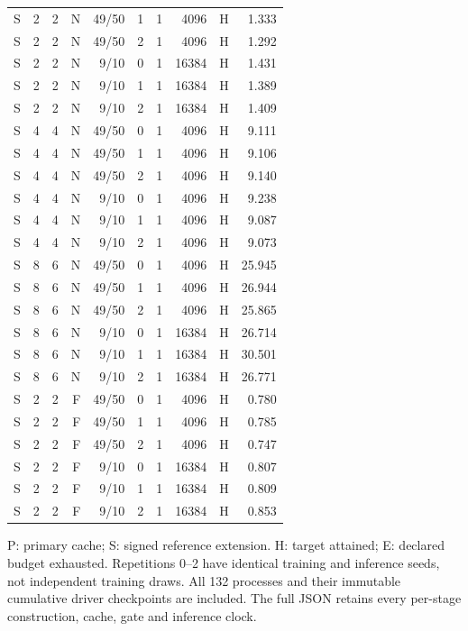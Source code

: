 \begin{longtable}{rrrrrrrrrr}
S & 2 & 2 & N & 49/50 & 1 & 1 & 4096 & H & 1.333 \\
S & 2 & 2 & N & 49/50 & 2 & 1 & 4096 & H & 1.292 \\
S & 2 & 2 & N & 9/10 & 0 & 1 & 16384 & H & 1.431 \\
S & 2 & 2 & N & 9/10 & 1 & 1 & 16384 & H & 1.389 \\
S & 2 & 2 & N & 9/10 & 2 & 1 & 16384 & H & 1.409 \\
S & 4 & 4 & N & 49/50 & 0 & 1 & 4096 & H & 9.111 \\
S & 4 & 4 & N & 49/50 & 1 & 1 & 4096 & H & 9.106 \\
S & 4 & 4 & N & 49/50 & 2 & 1 & 4096 & H & 9.140 \\
S & 4 & 4 & N & 9/10 & 0 & 1 & 4096 & H & 9.238 \\
S & 4 & 4 & N & 9/10 & 1 & 1 & 4096 & H & 9.087 \\
S & 4 & 4 & N & 9/10 & 2 & 1 & 4096 & H & 9.073 \\
S & 8 & 6 & N & 49/50 & 0 & 1 & 4096 & H & 25.945 \\
S & 8 & 6 & N & 49/50 & 1 & 1 & 4096 & H & 26.944 \\
S & 8 & 6 & N & 49/50 & 2 & 1 & 4096 & H & 25.865 \\
S & 8 & 6 & N & 9/10 & 0 & 1 & 16384 & H & 26.714 \\
S & 8 & 6 & N & 9/10 & 1 & 1 & 16384 & H & 30.501 \\
S & 8 & 6 & N & 9/10 & 2 & 1 & 16384 & H & 26.771 \\
S & 2 & 2 & F & 49/50 & 0 & 1 & 4096 & H & 0.780 \\
S & 2 & 2 & F & 49/50 & 1 & 1 & 4096 & H & 0.785 \\
S & 2 & 2 & F & 49/50 & 2 & 1 & 4096 & H & 0.747 \\
S & 2 & 2 & F & 9/10 & 0 & 1 & 16384 & H & 0.807 \\
S & 2 & 2 & F & 9/10 & 1 & 1 & 16384 & H & 0.809 \\
S & 2 & 2 & F & 9/10 & 2 & 1 & 16384 & H & 0.853 \\
\bottomrule
\end{longtable}
\noindent P: primary cache; S: signed reference extension. H: target attained; E: declared budget exhausted. Repetitions 0--2 have identical training and inference seeds, not independent training draws. All 132 processes and their immutable cumulative driver checkpoints are included. The full JSON retains every per-stage construction, cache, gate and inference clock.
\endgroup
